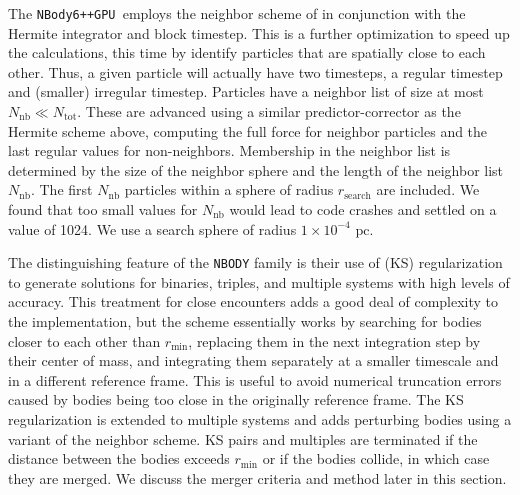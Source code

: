 \documentclass[preprint1]{aastex}
\newcommand\pc{\mbox{ pc}}
\newcommand\nbody{\texttt{NBody6++GPU }}
\numberwithin{equation}{section}
\begin{document}
The \nbody employs the neighbor scheme of \citet{1973Ahmad} in conjunction with the Hermite integrator and block timestep. This is a further optimization to speed up the calculations, this time by identify particles that are spatially close to each other. Thus, a given particle will actually have two timesteps, a regular timestep and (smaller) irregular timestep. Particles have a neighbor list of size at most $N_{\mathrm{nb}} \ll N_{\mathrm{tot}}$.  These are advanced using a similar predictor-corrector as the Hermite scheme above, computing the full force for neighbor particles and the last regular values for non-neighbors. Membership in the neighbor list is determined by the size of the neighbor sphere and the length of the neighbor list $N_{\mathrm{nb}}$.  The first $N_{\mathrm{nb}}$ particles within a sphere of radius $r_{\mathrm{search}}$ are included.  We found that too small values for $N_{\mathrm{nb}}$ would lead to code crashes and settled on a value of 1024.  We use a search sphere of radius $1 \times 10^{-4} \pc$.

The distinguishing feature of the \texttt{NBODY} family is their use of \citet{1965Kusta} (KS) regularization to generate solutions for binaries, triples, and multiple systems with high levels of accuracy.  This treatment for close encounters adds a good deal of complexity to the implementation, but the scheme essentially works by searching for bodies closer to each other than $r_{\mathrm{min}}$, replacing them in the next integration step by their center of mass, and integrating them separately at a smaller timescale and in a different reference frame. This is useful to avoid numerical truncation errors caused by bodies being too close in the originally reference frame. The KS regularization is extended to multiple systems and adds perturbing bodies using a variant of the \citet{1973Ahmad} neighbor scheme. KS pairs and multiples are terminated if the distance between the bodies exceeds $r_{\mathrm{min}}$ or if the bodies collide, in which case they are merged.  We discuss the merger criteria and method later in this section.
\end{document}
